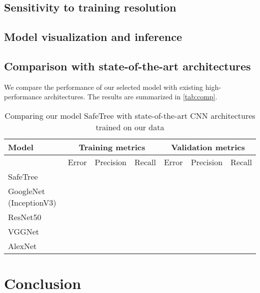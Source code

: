 \documentclass[Journal, letterpaper]{ascelike-new}
\newcommand{\?}{\stackrel{?}{=}}
\begin{document}
\subsection{Sensitivity to training resolution}

\subsection{Model visualization and inference}

\subsection{Comparison with state-of-the-art architectures}
We compare the performance of our selected model with existing high-performance architectures. The results are summarized in \autoref{tab:comp}.

\begin{table}[h!]\small
  \centering
  \begin{tabular}{l l l l l l l }\toprule
    \bf Model & \multicolumn{3}{c}{\bf Training metrics} &\multicolumn{3}{c}{\bf Validation metrics}  \\\midrule
    & Error & Precision & Recall     & Error & Precision & Recall \\
    SafeTree & & & & & & \\
    GoogleNet (InceptionV3) & & & & & & \\
    ResNet50 & & & & & & \\
        VGGNet & & & & & & \\
    AlexNet & & & & & & \\\bottomrule
  \end{tabular}
  \caption{Comparing our model SafeTree with state-of-the-art CNN architectures trained on our data}
  \label{tab:comp}
\end{table}
\section{Conclusion}



\appendix
\end{document}
